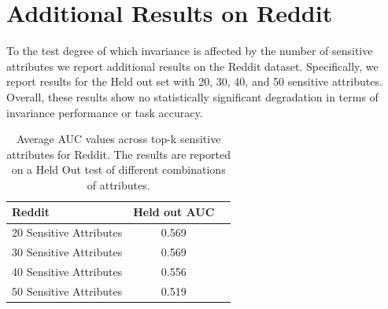 \documentclass{article}
\begin{document}
\section{Additional Results on Reddit}
To the test degree of which invariance is affected by the number of sensitive attributes we report additional results on the Reddit dataset. Specifically, we report results for the Held out set with  20, 30, 40, and 50 sensitive attributes. Overall, these results show no statistically significant degradation in terms of invariance performance or task accuracy. 

\begin{table}[t]
\caption{Average AUC values across top-k sensitive attributes for Reddit. The results are reported on a Held Out test of different combinations of attributes.}
\label{sample-table}
\vskip 0.15in
\begin{center}
\begin{small}
\begin{sc}
\begin{tabular}{lcr}
\toprule
Reddit & \multicolumn{1}{p{1.5cm}}{\centering Held out AUC} \\
\midrule
20 Sensitive Attributes  & 0.569 \\
30 Sensitive Attributes  & 0.569 \\
40 Sensitive Attributes  & 0.556  \\
50 Sensitive Attributes  & 0.519 \\

\bottomrule
\end{tabular}
\end{sc}
\end{small}
\end{center}
\vskip -0.1in
\label{fb_exp}
\end{table}
\end{document}
